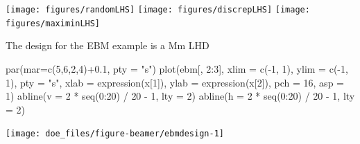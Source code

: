 \documentclass[
  ignorenonframetext,
]{beamer}
\newenvironment{Shaded}{\begin{snugshade}}{\end{snugshade}}
\newcommand{\AttributeTok}[1]{\textcolor[rgb]{0.77,0.63,0.00}{#1}}
\newcommand{\DecValTok}[1]{\textcolor[rgb]{0.00,0.00,0.81}{#1}}
\newcommand{\FloatTok}[1]{\textcolor[rgb]{0.00,0.00,0.81}{#1}}
\newcommand{\FunctionTok}[1]{\textcolor[rgb]{0.00,0.00,0.00}{#1}}
\newcommand{\NormalTok}[1]{#1}
\newcommand{\SpecialCharTok}[1]{\textcolor[rgb]{0.00,0.00,0.00}{#1}}
\newcommand{\StringTok}[1]{\textcolor[rgb]{0.31,0.60,0.02}{#1}}
\begin{document}
\begin{frame}{}
\protect\hypertarget{section-40}{}
\texttt{[image: figures/randomLHS]}
\texttt{[image: figures/discrepLHS]}
\texttt{[image: figures/maximinLHS]}
\end{frame}

\begin{frame}[fragile]{}
\protect\hypertarget{section-41}{}
The design for the EBM example is a Mm LHD

\begin{Shaded}
\begin{Highlighting}[]
\FunctionTok{par}\NormalTok{(}\AttributeTok{mar=}\FunctionTok{c}\NormalTok{(}\DecValTok{5}\NormalTok{,}\DecValTok{6}\NormalTok{,}\DecValTok{2}\NormalTok{,}\DecValTok{4}\NormalTok{)}\SpecialCharTok{+}\FloatTok{0.1}\NormalTok{, }\AttributeTok{pty =} \StringTok{"s"}\NormalTok{)}
\FunctionTok{plot}\NormalTok{(ebm[, }\DecValTok{2}\SpecialCharTok{:}\DecValTok{3}\NormalTok{], }\AttributeTok{xlim =} \FunctionTok{c}\NormalTok{(}\SpecialCharTok{{-}}\DecValTok{1}\NormalTok{, }\DecValTok{1}\NormalTok{), }\AttributeTok{ylim =} \FunctionTok{c}\NormalTok{(}\SpecialCharTok{{-}}\DecValTok{1}\NormalTok{, }\DecValTok{1}\NormalTok{), }\AttributeTok{pty =} \StringTok{"s"}\NormalTok{, }\AttributeTok{xlab =} \FunctionTok{expression}\NormalTok{(x[}\DecValTok{1}\NormalTok{]), }
     \AttributeTok{ylab =} \FunctionTok{expression}\NormalTok{(x[}\DecValTok{2}\NormalTok{]), }\AttributeTok{pch =} \DecValTok{16}\NormalTok{, }\AttributeTok{asp =} \DecValTok{1}\NormalTok{)}
\FunctionTok{abline}\NormalTok{(}\AttributeTok{v =} \DecValTok{2} \SpecialCharTok{*} \FunctionTok{seq}\NormalTok{(}\DecValTok{0}\SpecialCharTok{:}\DecValTok{20}\NormalTok{) }\SpecialCharTok{/} \DecValTok{20} \SpecialCharTok{{-}} \DecValTok{1}\NormalTok{, }\AttributeTok{lty =} \DecValTok{2}\NormalTok{)}
\FunctionTok{abline}\NormalTok{(}\AttributeTok{h =} \DecValTok{2} \SpecialCharTok{*} \FunctionTok{seq}\NormalTok{(}\DecValTok{0}\SpecialCharTok{:}\DecValTok{20}\NormalTok{) }\SpecialCharTok{/} \DecValTok{20} \SpecialCharTok{{-}} \DecValTok{1}\NormalTok{, }\AttributeTok{lty =} \DecValTok{2}\NormalTok{)}
\end{Highlighting}
\end{Shaded}

\begin{center}\texttt{[image: doe\_files/figure-beamer/ebmdesign-1]} \end{center}
\end{frame}
\end{document}
